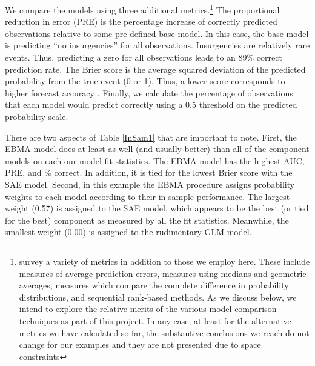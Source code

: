 \documentclass[pdftex,12pt,fullpage,oneside]{amsart}
\begin{document}
We compare the models using three additional
metrics.\footnote{\citet{brandt:freeman:schrodt:2011} survey a variety
  of metrics in addition to those we employ here. These include
  measures of average prediction errors, measures using medians and
  geometric averages, measures which compare the complete difference
  in probability distributions, and sequential rank-based methods.  As
  we discuss below, we intend to explore the relative merits of the
  various model comparison techniques as part of this project.  In any
  case, at least for the alternative metrics we have calculated so
  far, the substantive conclusions we reach do not change for our
  examples and they are not presented due to space constraints} The
proportional reduction in error (PRE) is the percentage increase of
correctly predicted observations relative to some pre-defined base
model. In this case, the base model is predicting ``no insurgencies''
for all observations.  Insurgencies are relatively rare events.  Thus,
predicting a zero for all observations leads to an 89\% correct
prediction rate. The Brier score is the average squared deviation of
the predicted probability from the true event (0 or 1).  Thus, a lower
score corresponds to higher forecast accuracy \citep{Brier:1950}.
Finally, we calculate the percentage of observations that each model
would predict correctly using a 0.5 threshold on the predicted
probability scale. 

There are two aspects of Table \ref{InSam1} that are important to
note.  First, the EBMA model does at least as well (and usually
better) than all of the component models on each our model fit
statistics.  The EBMA model has the highest AUC, PRE, and \% correct.
In addition, it is tied for the lowest Brier score with the SAE model.
Second, in this example the EBMA procedure assigns probability weights
to each model according to their in-sample performance.  The largest
weight (0.57) is assigned to the SAE model, which appears to be
the best (or tied for the best) component as measured by all the
fit statistics. Meanwhile, the smallest weight (0.00) is assigned to
the rudimentary GLM model.
\end{document}
